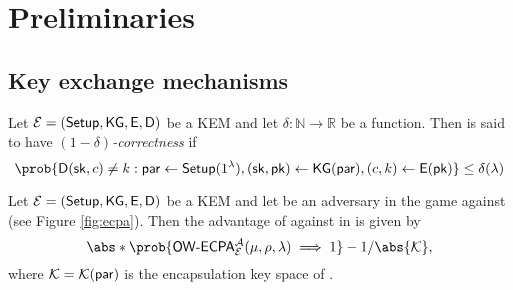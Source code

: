 
\section{Preliminaries}

\subsection{Key exchange mechanisms}


\begin{definition}\label{def:corr}
  Let \(\mathcal{E} = (\mathsf{Setup}, \mathsf{KG}, \mathsf{E}, \mathsf{D})\) be a KEM
  and let \(\delta : \mathbb{N} \to \mathbb{R}\) be a function.
  Then \KEM is said to have \emph{\((1-\delta)\)-correctness} if
  \begin{equation}
    \prob{\Decaps{}(\sk,c) \ne k : \params \assign \Setup{}(1^{\lambda}), (\sk,\pk) \assign \KG{}(\params), (c,k) \assign \Encaps{}(\pk)} \le \delta (\lambda)
  \end{equation}
\end{definition}


\begin{definition}\label{def:OWECPA_sec}
  Let \(\mathcal{E} = (\mathsf{Setup}, \mathsf{KG}, \mathsf{E}, \mathsf{D})\) be a KEM
  and let \advA{} be an adversary in the \OWECPA{} game against \KEM (see Figure \ref{fig:ecpa}).
  Then the advantage of \advA{} against \OWECPA in \KEM is given by
  \begin{equation}
    \abs*{\prob{\OWECPA{}_{\KEM}^{\advA}(\mu,\rho,\lambda) \implies 1} - 1/\abs{\keyspace}},
  \end{equation}
  where \(\mathcal{K} = \mathcal{K}{}(\mathsf{par})\) is the encapsulation key space of \KEM.
\end{definition}

